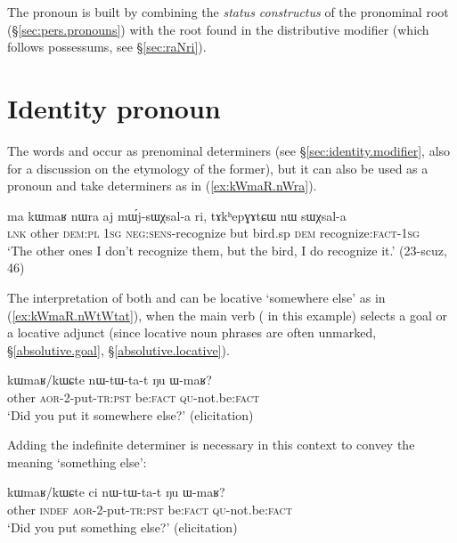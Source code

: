 The pronoun  is built by combining the \textit{status constructus} of the pronominal root  (§\ref{sec:pers.pronouns}) with the root  found in the distributive modifier  (which follows possessums, see §\ref{sec:raNri}).


\section{Identity pronoun} \label{sec:other.pro}
The words  and  occur as prenominal determiners (see §\ref{sec:identity.modifier}, also for a discussion on the etymology of the former), but it can also be used as a pronoun and take determiners as in (\ref{ex:kWmaR.nWra}).

\begin{exe}
\ex \label{ex:kWmaR.nWra}
\gll ma kɯmaʁ nɯra aj mɯ́j-sɯχsal-a ri, tɤkʰepɣɤtɕɯ nɯ sɯχsal-a  \\
\textsc{lnk} other \textsc{dem}:\textsc{pl} \textsc{1sg} \textsc{neg}:\textsc{sens}-recognize but bird.sp \textsc{dem} recognize:\textsc{fact}-\textsc{1sg} \\
\glt `The other ones I don't recognize them, but the  bird, I do recognize it.' (23-scuz, 46)
\end{exe}

The interpretation of both  and  can be locative  `somewhere else' as in (\ref{ex:kWmaR.nWtWtat}), when the main verb ( in this example) selects a goal or a locative adjunct (since locative noun phrases are often unmarked, §\ref{absolutive.goal}, §\ref{absolutive.locative}).

\begin{exe}
\ex \label{ex:kWmaR.nWtWtat}
\gll kɯmaʁ/kɯɕte   nɯ-tɯ-ta-t ŋu ɯ-maʁ? \\
other  \textsc{aor}-2-put-\textsc{tr}:\textsc{pst} be:\textsc{fact} \textsc{qu}-not.be:\textsc{fact} \\
\glt `Did you put it somewhere else?' (elicitation)
\end{exe}

Adding the indefinite determiner  is necessary in this context to convey the meaning `something else':

\begin{exe}
\ex \label{ex:kWmaR.ci.nWtWtat}
\gll kɯmaʁ/kɯɕte ci nɯ-tɯ-ta-t ŋu ɯ-maʁ? \\
other \textsc{indef} \textsc{aor}-2-put-\textsc{tr}:\textsc{pst} be:\textsc{fact} \textsc{qu}-not.be:\textsc{fact} \\
\glt `Did you put something else?' (elicitation)
\end{exe}

